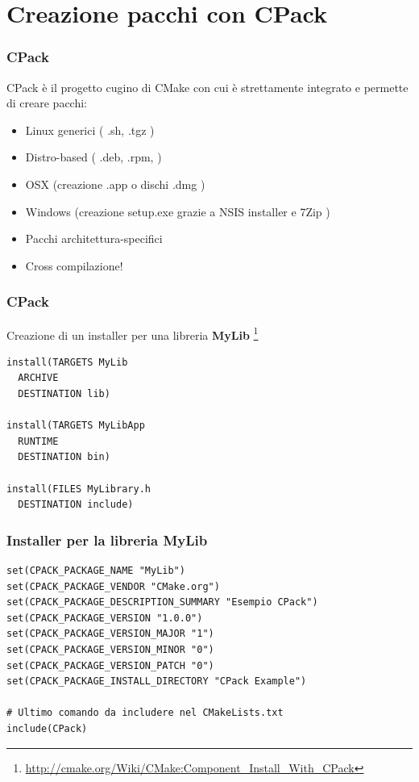 \documentclass[10pt] {beamer}
\begin{document}
\section{Creazione pacchi con CPack}
\begin{frame}
\frametitle{CPack}
CPack è il progetto cugino di CMake con cui è strettamente integrato e permette di creare pacchi:
\begin{itemize}
\item Linux generici ( .sh, .tgz )
\item Distro-based ( .deb, .rpm, )
\item OSX (creazione .app o dischi .dmg )
\item Windows (creazione setup.exe grazie a NSIS installer e 7Zip )
\end{itemize}
\begin{itemize}
\item Pacchi architettura-specifici
\item Cross compilazione!
\end{itemize}
\end{frame}

\begin{frame}[fragile]
\frametitle{CPack}
Creazione di un installer per una libreria  \textbf{MyLib} \footnote{\url{http://cmake.org/Wiki/CMake:Component_Install_With_CPack}}
\begin{verbatim}
install(TARGETS MyLib 
  ARCHIVE
  DESTINATION lib)

install(TARGETS MyLibApp
  RUNTIME
  DESTINATION bin)

install(FILES MyLibrary.h
  DESTINATION include)
\end{verbatim}
\end{frame}

\begin{frame}[fragile]
 \frametitle{Installer per la libreria MyLib}
\begin{verbatim}
set(CPACK_PACKAGE_NAME "MyLib")
set(CPACK_PACKAGE_VENDOR "CMake.org")
set(CPACK_PACKAGE_DESCRIPTION_SUMMARY "Esempio CPack")
set(CPACK_PACKAGE_VERSION "1.0.0")
set(CPACK_PACKAGE_VERSION_MAJOR "1")
set(CPACK_PACKAGE_VERSION_MINOR "0")
set(CPACK_PACKAGE_VERSION_PATCH "0")
set(CPACK_PACKAGE_INSTALL_DIRECTORY "CPack Example")

# Ultimo comando da includere nel CMakeLists.txt
include(CPack)
\end{verbatim}
\end{frame}
\end{document}
